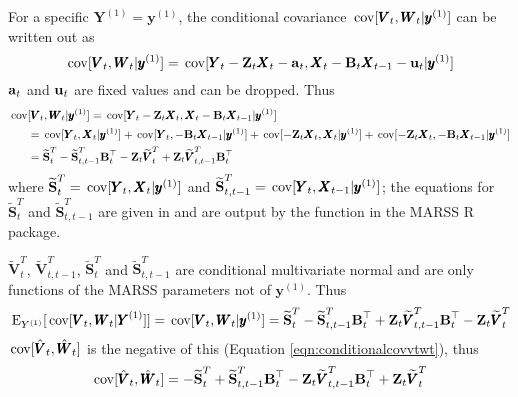\documentclass[]{article}
\def\UPS{\mbox{\boldmath $\Upsilon$}}
\def\XI{\mbox{\boldmath $\Xi$}}
\def\BB{\mbox{$\mathbf B$}}	\def\bb{\mbox{$\mathbf b$}} \def\Bb{\mbox{$\mathbf J$}} \def\Ba{\mbox{$\mathbf L$}} \def\Bm{\UPS}
\def\E{\,\textup{\textrm{E}}}
\def\Ss{\mbox{$\mathbf S$}}
\def\VV{\mbox{$\pmb{V}$}}	\def\vv{\mbox{$\pmb{v}$}}
\def\WW{\mbox{$\pmb{W}$}}	\def\ww{\mbox{$\pmb{w}$}}
\def\XX{\mbox{$\pmb{X}$}}	\def\xx{\mbox{$\pmb{x}$}}
\def\YY{\mbox{$\pmb{Y}$}}	\def\yy{\mbox{$\pmb{y}$}}
\def\ZZ{\mbox{$\mathbf Z$}}	\def\zz{\mbox{$\mathbf z$}}	\def\Zb{\mbox{$\mathbf M$}} \def\Za{\mbox{$\mathbf N$}} \def\Zm{\XI}
\def\cov{\,\textup{\textrm{cov}}}
\def\hatVt{\widetilde{\VV}_t^T}
\def\hatVttm{\widetilde{\VV}_{t,t-1}^T}
\def\hatSt{\widetilde{\Ss}_t^T}
\def\hatSttm{\widetilde{\Ss}_{t,t-1}^T}
\begin{document}
For a specific $\YY^{(1)}=\yy^{(1)}$, the conditional covariance $\cov[\VV_t, \WW_t|\yy^{(1)}]$ can be written out as
\begin{equation}
\cov[\VV_t, \WW_t|\yy^{(1)}] = \cov[\YY_t-\ZZ_t\XX_t-\aa_t, \XX_t-\BB_t\XX_{t-1}-\uu_t|\yy^{(1)}]
\end{equation}
$\aa_t$ and $\uu_t$ are fixed values and can be dropped. Thus
\begin{equation}
\begin{split}
\cov&[\VV_t, \WW_t|\yy^{(1)}] =\cov[\YY_t-\ZZ_t\XX_t, \XX_t-\BB_t\XX_{t-1}|\yy^{(1)}] \\
& =\cov[\YY_t,\XX_t|\yy^{(1)}] + \cov[\YY_t,-\BB_t\XX_{t-1}|\yy^{(1)}] + \cov[-\ZZ_t\XX_t,\XX_t|\yy^{(1)}] + \cov[-\ZZ_t\XX_t,-\BB_t\XX_{t-1}|\yy^{(1)}]\\
& = \hatSt - \hatSttm\BB_t^\top - \ZZ_t\hatVt + \ZZ_t\hatVttm\BB_t^\top
\end{split}
\end{equation}
where $\hatSt=\cov[\YY_t,\XX_t|\yy^{(1)}]$ and $\hatSttm=\cov[\YY_t,\XX_{t-1}|\yy^{(1)}]$; the equations for $\hatSt$ and $\hatSttm$ are given in \citet{Holmes2010} and are output by the \verb@MARSShatyt@ function in the MARSS R package.

$\hatVt$, $\hatVttm$, $\hatSt$ and $\hatSttm$ are conditional multivariate normal and are only functions of the MARSS parameters not of $\yy^{(1)}$. Thus 
\begin{equation}
\E_{Y^{(1)}}[ \cov[\VV_t, \WW_t|\YY^{(1)}] ]= \cov[\VV_t, \WW_t|\yy^{(1)}] = \hatSt - \hatSttm\BB_t^\top + \ZZ_t\hatVttm\BB_t^\top - \ZZ_t\hatVt
\end{equation}
$\cov[\hat{\VV}_t,\hat{\WW}_t]$ is the negative of this (Equation \ref{eqn:conditionalcovvtwt}), thus
\begin{equation}
\cov[\hat{\VV}_t,\hat{\WW}_t] = - \hatSt + \hatSttm\BB_t^\top - \ZZ_t\hatVttm\BB_t^\top + \ZZ_t\hatVt
\end{equation}
\end{document}
